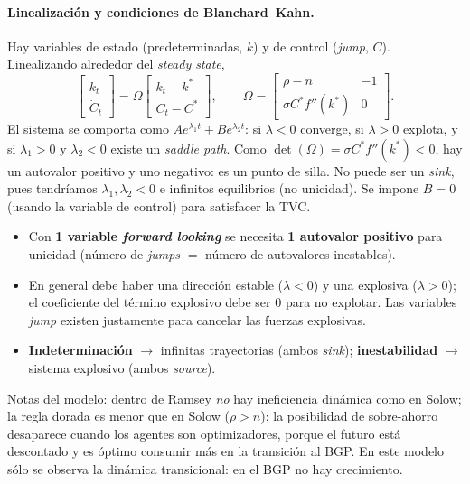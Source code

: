 \documentclass[11pt]{article}
\theoremstyle{definition}
\begin{document}
\paragraph{Linealización y condiciones de Blanchard--Kahn.} Hay variables de estado (predeterminadas,
$k$) y de control (\emph{jump}, $C$). Linealizando alrededor del \emph{steady state},
\begin{equation}
\begin{bmatrix}\dot{k}_{t}\\ \dot{C}_{t}\end{bmatrix}
=\Omega\begin{bmatrix}k_{t}-k^{\ast}\\ C_{t}-C^{\ast}\end{bmatrix},
\qquad
\Omega=\begin{bmatrix}\rho-n & -1\\[2pt] \sigma C^{\ast}f''(k^{\ast}) & 0\end{bmatrix}.
\end{equation}
El sistema se comporta como $A e^{\lambda_{1}t}+B e^{\lambda_{2}t}$: si $\lambda<0$ converge, si
$\lambda>0$ explota, y si $\lambda_{1}>0$ y $\lambda_{2}<0$ existe un \emph{saddle path}. Como
$\det(\Omega)=\sigma C^{\ast}f''(k^{\ast})<0$, hay un autovalor positivo y uno negativo: es un punto de
silla. No puede ser un \emph{sink}, pues tendríamos $\lambda_{1},\lambda_{2}<0$ e infinitos equilibrios
(no unicidad). Se impone $B=0$ (usando la variable de control) para satisfacer la TVC.
\begin{itemize}[leftmargin=1.4em]
\item Con \textbf{1 variable \emph{forward looking}} se necesita \textbf{1 autovalor positivo} para
unicidad (número de \emph{jumps} $=$ número de autovalores inestables).
\item En general debe haber una dirección estable ($\lambda<0$) y una explosiva ($\lambda>0$); el
coeficiente del término explosivo debe ser $0$ para no explotar. Las variables \emph{jump} existen
justamente para cancelar las fuerzas explosivas.
\item \textbf{Indeterminación} $\to$ infinitas trayectorias (ambos \emph{sink});
\textbf{inestabilidad} $\to$ sistema explosivo (ambos \emph{source}).
\end{itemize}
Notas del modelo: dentro de Ramsey \emph{no} hay ineficiencia dinámica como en Solow; la regla dorada
es menor que en Solow ($\rho>n$); la posibilidad de sobre-ahorro desaparece cuando los agentes son
optimizadores, porque el futuro está descontado y es óptimo consumir más en la transición al BGP. En
este modelo sólo se observa la dinámica transicional: en el BGP no hay crecimiento.
\end{document}
